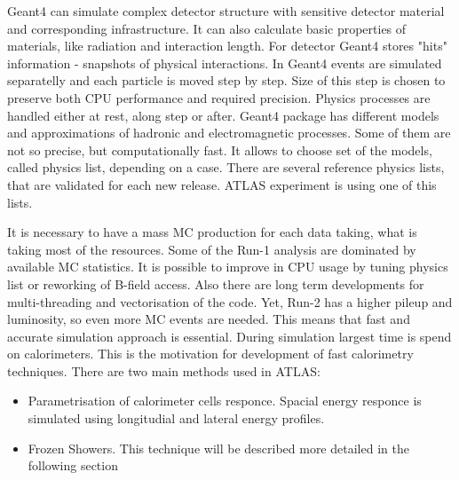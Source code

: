Geant4 can simulate complex detector structure with sensitive detector material and corresponding infrastructure. It can also calculate basic properties of materials, like radiation and interaction length. For detector Geant4 stores "hits" information  - snapshots of physical interactions. 
In Geant4 events are simulated separatelly and each particle is moved step by step. Size of this step is chosen to preserve both CPU performance and required precision. Physics processes are handled either at rest, along step or after. Geant4 package has different models and approximations of hadronic and electromagnetic processes. Some of them are not so precise, but computationally fast. It allows to choose set of the models, called physics list, depending on a case. There are several reference physics lists, that are validated for each new release. ATLAS experiment is using one of this lists.

It is necessary to have a mass MC production for each data taking, what is taking most of the resources.  Some of the Run-1 analysis are dominated by available MC statistics. 
It is possible to improve in CPU usage by tuning physics list or reworking of B-field access. Also there are long term developments for multi-threading and vectorisation of the code. 
Yet, Run-2 has a higher pileup and luminosity, so even more MC events are needed. This means that fast and accurate simulation approach is essential. During simulation largest time is spend on calorimeters. This is the motivation for development of fast calorimetry techniques.  
There are two main methods used in ATLAS:
\begin{itemize}
\item Parametrisation of calorimeter cells responce. Spacial energy responce is simulated using longitudial and lateral energy profiles.
\item Frozen Showers. This technique will be described more detailed in the following section
\end{itemize}


